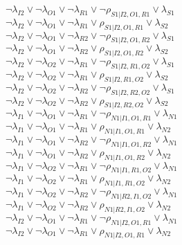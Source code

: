 $\neg\lambda_{I2} \vee \neg\lambda_{O1} \vee \neg\lambda_{R1} \vee \neg\rho_{S1|I2,O1,R1} \vee \lambda_{S1}$\\
$\neg\lambda_{I2} \vee \neg\lambda_{O1} \vee \neg\lambda_{R1} \vee \rho_{S1|I2,O1,R1} \vee \lambda_{S2}$\\
$\neg\lambda_{I2} \vee \neg\lambda_{O1} \vee \neg\lambda_{R2} \vee \neg\rho_{S1|I2,O1,R2} \vee \lambda_{S1}$\\
$\neg\lambda_{I2} \vee \neg\lambda_{O1} \vee \neg\lambda_{R2} \vee \rho_{S1|I2,O1,R2} \vee \lambda_{S2}$\\
$\neg\lambda_{I2} \vee \neg\lambda_{O2} \vee \neg\lambda_{R1} \vee \neg\rho_{S1|I2,R1,O2} \vee \lambda_{S1}$\\
$\neg\lambda_{I2} \vee \neg\lambda_{O2} \vee \neg\lambda_{R1} \vee \rho_{S1|I2,R1,O2} \vee \lambda_{S2}$\\
$\neg\lambda_{I2} \vee \neg\lambda_{O2} \vee \neg\lambda_{R2} \vee \neg\rho_{S1|I2,R2,O2} \vee \lambda_{S1}$\\
$\neg\lambda_{I2} \vee \neg\lambda_{O2} \vee \neg\lambda_{R2} \vee \rho_{S1|I2,R2,O2} \vee \lambda_{S2}$\\
$\neg\lambda_{I1} \vee \neg\lambda_{O1} \vee \neg\lambda_{R1} \vee \neg\rho_{N1|I1,O1,R1} \vee \lambda_{N1}$\\
$\neg\lambda_{I1} \vee \neg\lambda_{O1} \vee \neg\lambda_{R1} \vee \rho_{N1|I1,O1,R1} \vee \lambda_{N2}$\\
$\neg\lambda_{I1} \vee \neg\lambda_{O1} \vee \neg\lambda_{R2} \vee \neg\rho_{N1|I1,O1,R2} \vee \lambda_{N1}$\\
$\neg\lambda_{I1} \vee \neg\lambda_{O1} \vee \neg\lambda_{R2} \vee \rho_{N1|I1,O1,R2} \vee \lambda_{N2}$\\
$\neg\lambda_{I1} \vee \neg\lambda_{O2} \vee \neg\lambda_{R1} \vee \neg\rho_{N1|I1,R1,O2} \vee \lambda_{N1}$\\
$\neg\lambda_{I1} \vee \neg\lambda_{O2} \vee \neg\lambda_{R1} \vee \rho_{N1|I1,R1,O2} \vee \lambda_{N2}$\\
$\neg\lambda_{I1} \vee \neg\lambda_{O2} \vee \neg\lambda_{R2} \vee \neg\rho_{N1|R2,I1,O2} \vee \lambda_{N1}$\\
$\neg\lambda_{I1} \vee \neg\lambda_{O2} \vee \neg\lambda_{R2} \vee \rho_{N1|R2,I1,O2} \vee \lambda_{N2}$\\
$\neg\lambda_{I2} \vee \neg\lambda_{O1} \vee \neg\lambda_{R1} \vee \neg\rho_{N1|I2,O1,R1} \vee \lambda_{N1}$\\
$\neg\lambda_{I2} \vee \neg\lambda_{O1} \vee \neg\lambda_{R1} \vee \rho_{N1|I2,O1,R1} \vee \lambda_{N2}$\\
